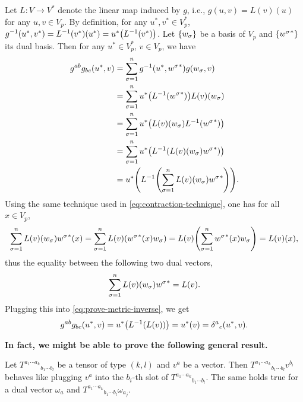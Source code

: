 \documentclass{note}
\numberwithin{equation}{chapter}
\begin{document}
Let $L\colon V\to V^*$ denote the linear map induced by $g$, i.e., $g(u, v) =
    L(v)(u)$ for any $u, v \in V_p$. By definition, for any $u^*, v^* \in V_p^*$,
$g^{-1}(u^*, v^*) = L^{-1}(v^*)(u^*) = u^*\prn{L^{-1}(v^*)}$. Let
$\set{w_\sigma}$ be a basis of $V_p$ and $\set{{w^\sigma}^*}$ its dual basis.
Then for any $u^* \in V_p^*$, $v \in V_p$, we have
\begin{align}
    g^{ab}g_{bc}(u^*, v)
     & = \sum_{\sigma=1}^n g^{-1}\prn{u^*, {w^\sigma}^*} g(w_\sigma, v) \notag     \\
     & = \sum_{\sigma=1}^n u^*\prn{L^{-1}\prn{{w^\sigma}^*}} L(v)(w_\sigma) \notag \\
     & = \sum_{\sigma=1}^n u^*\prn{L(v)\prn{w_\sigma}L^{-1}({w^\sigma}^*)} \notag  \\
     & = \sum_{\sigma=1}^n u^*\prn{L^{-1}\prn{L(v)(w_\sigma){w^\sigma}^*}} \notag  \\
     & = u^*\prn{L^{-1}\prn{\sum_{\sigma=1}^n L(v)\prn{w_\sigma}{w^\sigma}^*}}.
    \label{eq:prove-metric-inverse}
\end{align}
Using the same technique used in \eqref{eq:contraction-technique}, one has for
all $x \in V_p$,
\begin{equation*}
    \sum_{\sigma=1}^n L(v)\prn{w_\sigma}{w^\sigma}^*(x) = \sum_{\sigma=1}^n
    L(v)\prn{{w^\sigma}^*(x) w_\sigma} = L(v)\prn{\sum_{\sigma=1}^n {w^\sigma}^*(x)
    w_\sigma} = L(v)(x),
\end{equation*}
thus the equality between the following two dual vectors,
\begin{equation*}
    \sum_{\sigma=1}^n L(v)\prn{w_\sigma}{w^\sigma}^* = L(v).
\end{equation*}
Plugging this into \eqref{eq:prove-metric-inverse}, we get
\begin{equation*}
    g^{ab}g_{bc}(u^*, v) = u^*\prn{L^{-1}(L(v))} = u^*(v) =
    {\delta^a}_c\prn{u^*,v}.
\end{equation*}

{\bfseries In fact, we might be able to prove the following general result.}
\begin{lemma*}
    Let ${T^{a_1\cdots a_k}}_{b_1\cdots b_l}$ be a tensor of type $(k,l)$ and $v^a$
    be a vector. Then ${T^{a_1\cdots a_k}}_{b_1\cdots b_l}v^{b_i}$ behaves like
    plugging $v^a$ into the $b_i$-th slot of ${T^{a_1\cdots a_k}}_{b_1\cdots b_l}$.
    The same holds true for a dual vector $\omega_a$ and ${T^{a_1\cdots
                        a_k}}_{b_1\cdots b_l}\omega_{a_j}$.
\end{lemma*}
\end{document}
